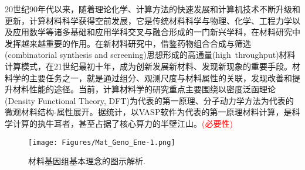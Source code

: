 20世纪90年代以来，随着理论化学、计算方法的快速发展和计算机技术不断升级和更新，计算材料科学获得空前发展，它是传统材料科学与物理、化学、工程力学以及应用数学等诸多基础和应用学科交叉与融合形成的一门新兴学科，在材料研究中发挥越来越重要的作用。在新材料研究中，借鉴药物组合合成与筛选\textrm{(combinatorial synthesis and screening)}思想形成的高通量(\textrm{high~throughput})材料计算模式，在21世纪最初十年，成为创新发展新材料、发现新现象的重要手段。材料学的主要任务之一，就是通过组分、观测尺度与材料属性的关联，发现改善和提升材料性能的途径。当前，计算材料学的研究重点主要围绕以密度泛函理论\textrm{(Density Functional Theory, DFT)}为代表的第一原理、分子动力学方法为代表的微观材料结构-属性展开。据统计，以\textrm{VASP}软件为代表的第一原理材料计算，是科学计算的执牛耳者，甚至占据了核心算力的半壁江山。\textcolor{red}{(必要性)}
\begin{figure}[h!]
\centering
\vspace*{-0.05in}
\texttt{[image: Figures/Mat\_Geno\_Ene-1.png]}
\caption{材料基因组基本理念的图示解析.}
\label{Fig:Mater_Genome}
\end{figure}

